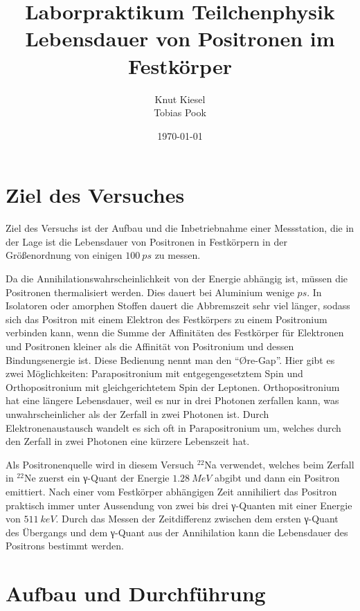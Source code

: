 \documentclass[a4paper,12pt]{article}
\title{Laborpraktikum Teilchenphysik\\ Lebensdauer von Positronen im Festkörper}
\author{Knut Kiesel\\Tobias Pook}
\date{\today}
\begin{document}
\maketitle
\vspace{1cm}
\tableofcontents
\thispagestyle{empty}
\newpage
\setcounter{page}{1}

\section{Ziel des Versuches}
Ziel des Versuchs ist der Aufbau und die Inbetriebnahme einer Messstation,
die in der Lage ist die Lebensdauer von Positronen in Festkörpern in der
Größenordnung von einigen $\SI{100}{ps}$ zu messen.

Da die Annihilationswahrscheinlichkeit von der Energie abhängig ist,
müssen die Positronen thermalisiert werden.
Dies dauert bei Aluminium wenige $\si{ps}$.
In Isolatoren oder amorphen Stoffen dauert die Abbremszeit sehr viel länger,
sodass sich das Positron mit einem Elektron des Festkörpers zu einem Positronium verbinden kann,
wenn die Summe der Affinitäten des Festkörper für Elektronen und Positronen kleiner
als die Affinität von Positronium und dessen Bindungsenergie ist.
Diese Bedienung  nennt man den "`Øre-Gap"'.
Hier gibt es zwei Möglichkeiten: Parapositronium mit entgegengesetztem Spin und Orthopositronium mit
gleichgerichtetem Spin der Leptonen.
Orthopositronium hat eine längere Lebensdauer, weil es nur in drei Photonen zerfallen kann, was unwahrscheinlicher als der Zerfall in zwei Photonen ist.
Durch Elektronenaustausch wandelt es sich oft in Parapositronium um, welches durch den Zerfall in zwei Photonen eine kürzere Lebenszeit hat.

Als Positronenquelle wird in diesem Versuch $^{22}$Na verwendet, welches beim Zerfall in $^{22}$Ne
zuerst ein γ-Quant der Energie $\SI{1.28}{MeV}$ abgibt und dann ein Positron emittiert.
Nach einer vom Festkörper abhängigen Zeit annihiliert das Positron praktisch immer unter Aussendung
von zwei bis drei γ-Quanten mit einer Energie von $\SI{511}{keV}$.
Durch das Messen der Zeitdifferenz zwischen dem ersten γ-Quant des Übergangs und dem
γ-Quant aus der Annihilation kann die Lebensdauer des Positrons bestimmt werden.


\section{Aufbau und Durchführung}
\end{document}
